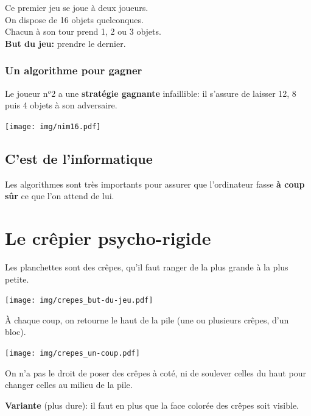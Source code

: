 \documentclass[a7paper,pagesize,DIV=14,10pt]{scrbook}
\begin{document}
\vspace{-.5\baselineskip}
Ce premier jeu se joue à deux joueurs.\\
On dispose de 16 objets quelconques.\\
Chacun à son tour prend 1, 2 ou 3 objets.\\
\textbf{But du jeu:} prendre le dernier.

\vspace{-.5\baselineskip}
\subsubsection*{Un algorithme pour gagner}

\vspace{-.5\baselineskip} %
Le joueur n$^o$2 a une \textbf{stratégie gagnante} infaillible: il
s'assure de laisser 12, 8 puis 4 objets à son adversaire.

\texttt{[image: img/nim16.pdf]}

\subsection*{C'est de l'informatique}
\vspace{-.5\baselineskip} %
Les algorithmes sont très importants pour assurer que l'ordinateur
fasse \textbf{à coup sûr} ce que l'on attend de lui.

\newpage
\section*{Le crêpier psycho-rigide}

\vspace{-.5\baselineskip}
Les planchettes sont des crêpes, qu'il faut ranger de la plus grande à
la plus petite.

\smallskip
\texttt{[image: img/crepes\_but-du-jeu.pdf]}

À chaque coup, on retourne le haut de la pile (une ou plusieurs crêpes,
d'un bloc).

\smallskip
\texttt{[image: img/crepes\_un-coup.pdf]}

\medskip%
On n'a pas le droit de poser des crêpes à coté, ni de soulever celles
du haut pour changer celles au milieu de la pile.

\bigskip%
\textbf{Variante} (plus dure): il faut en plus que la face colorée des
crêpes soit visible.
\end{document}
